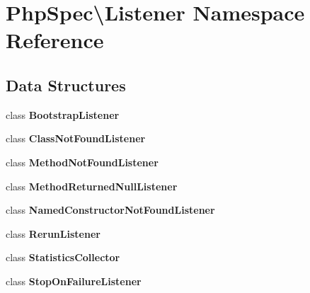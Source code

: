\section{Php\+Spec\textbackslash{}Listener Namespace Reference}
\label{namespace_php_spec_1_1_listener}
\subsection*{Data Structures}
\begin{DoxyCompactItemize}
\item 
class {\bf Bootstrap\+Listener}
\item 
class {\bf Class\+Not\+Found\+Listener}
\item 
class {\bf Method\+Not\+Found\+Listener}
\item 
class {\bf Method\+Returned\+Null\+Listener}
\item 
class {\bf Named\+Constructor\+Not\+Found\+Listener}
\item 
class {\bf Rerun\+Listener}
\item 
class {\bf Statistics\+Collector}
\item 
class {\bf Stop\+On\+Failure\+Listener}
\end{DoxyCompactItemize}
